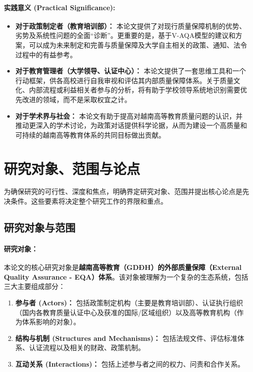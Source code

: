 \paragraph{实践意义 (Practical Significance):}
\begin{itemize}
    \item \textbf{对于政策制定者（教育培训部）：} 本论文提供了对现行质量保障机制的优势、劣势及系统性问题的全面“诊断”。更重要的是，基于V-AQA模型的建议和方案，可以成为未来制定和完善与质量保障及大学自主相关的政策、通知、法令过程中的有益参考。
    \item \textbf{对于教育管理者（大学领导、认证中心）：} 本论文提供了一套思维工具和一个行动框架，供各高校进行自我审视和评估其内部质量保障体系。关于质量文化、内部流程或利益相关者参与的分析，将有助于学校领导系统地识别需要优先改进的领域，而不是采取权宜之计。
    \item \textbf{对于学术界与社会：} 本论文有助于提高对越南高等教育质量问题的认识，并推动更深入的学术讨论，为政策对话提供科学论据，从而为建设一个高质量和可持续的越南高等教育体系的共同目标做出贡献。
\end{itemize}




\section{研究对象、范围与论点}
\label{sec:doi_tuong_pham_vi_luandiem}

为确保研究的可行性、深度和焦点，明确界定研究对象、范围并提出核心论点是先决条件。这些要素将决定整个研究工作的界限和重点。

\subsection{研究对象与范围}
\label{subsec:doi_tuong_pham_vi}

\paragraph{研究对象：}
本论文的核心研究对象是\textbf{越南高等教育（GDĐH）的外部质量保障（External Quality Assurance - EQA）体系}。该对象被理解为一个复杂的生态系统，包括三大主要组成部分：
\begin{enumerate}
    \item \textbf{参与者 (Actors)：} 包括政策制定机构（主要是教育培训部）、认证执行组织（国内各教育质量认证中心及获准的国际/区域组织）以及高等教育机构（作为体系影响的对象）。
    \item \textbf{结构与机制 (Structures and Mechanisms)：} 包括法规文件、评估标准体系、认证流程以及相关的财政、政策机制。
    \item \textbf{互动关系 (Interactions)：} 包括上述参与者之间的权力、问责和合作关系。
\end{enumerate}

